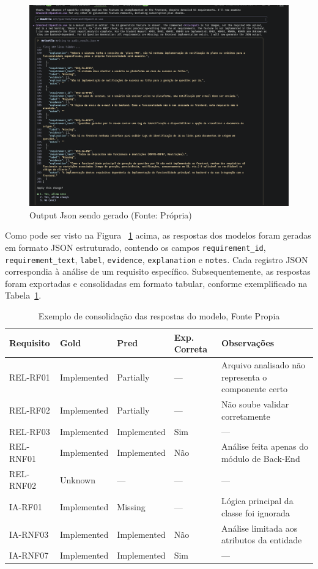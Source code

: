 \begin{figure}[H]
    \centering
    \includegraphics[width=1.0\textwidth]{imgs/jsongGeneration.png}
    \caption{Output Json sendo gerado  (Fonte: Própria)}
    \label{fig:json_prompt}
\end{figure}

Como pode ser visto na Figura ~\ref{fig:json_prompt} acima, as respostas dos modelos foram geradas em formato JSON estruturado, contendo os campos \texttt{requirement\_id}, \texttt{requirement\_text}, \texttt{label}, \texttt{evidence}, \texttt{explanation} e \texttt{notes}. Cada registro JSON correspondia à análise de um requisito específico. Subsequentemente, as respostas foram exportadas e consolidadas em formato tabular, conforme exemplificado na Tabela~\ref{tab:exemplo-resultados}. 


\begin{table}[H]
\centering
\caption{Exemplo de consolidação das respostas do modelo, Fonte Propia}
\label{tab:exemplo-resultados}
\begin{tabular}{|l|l|l|l|p{5.5cm}|}
\hline
\textbf{Requisito} & \textbf{Gold} & \textbf{Pred} & \textbf{Exp. Correta} & \textbf{Observações} \\
\hline
REL-RF01 & Implemented & Partially & --- & Arquivo analisado não representa o componente certo \\ 
REL-RF02 & Implemented & Partially & --- & Não soube validar corretamente \\ 
REL-RF03 & Implemented & Implemented & Sim & --- \\ 
REL-RNF01 & Implemented & Implemented & Não & Análise feita apenas do módulo de Back-End \\ 
REL-RNF02 & Unknown & --- & --- & --- \\ 
IA-RF01 & Implemented & Missing & --- & Lógica principal da classe foi ignorada \\ 
IA-RNF03 & Implemented & Implemented & Não & Análise limitada aos atributos da entidade \\ 
IA-RNF07 & Implemented & Implemented & Sim & --- \\ 
\hline
\end{tabular}
\end{table}

